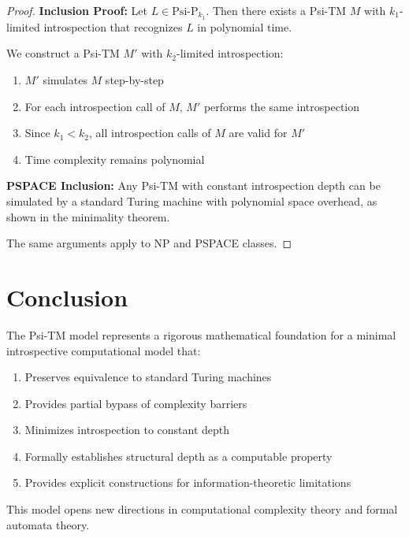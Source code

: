 \documentclass[11pt]{article}
\begin{document}
\begin{proof}
\textbf{Inclusion Proof:}
Let $L \in \text{Psi-P}_{k_1}$. Then there exists a Psi-TM $M$ with $k_1$-limited introspection that recognizes $L$ in polynomial time.

We construct a Psi-TM $M'$ with $k_2$-limited introspection:
\begin{enumerate}
\item $M'$ simulates $M$ step-by-step
\item For each introspection call of $M$, $M'$ performs the same introspection
\item Since $k_1 < k_2$, all introspection calls of $M$ are valid for $M'$
\item Time complexity remains polynomial
\end{enumerate}

\textbf{PSPACE Inclusion:}
Any Psi-TM with constant introspection depth can be simulated by a standard Turing machine with polynomial space overhead, as shown in the minimality theorem.

The same arguments apply to NP and PSPACE classes.
\end{proof}

\section{Conclusion}

The Psi-TM model represents a rigorous mathematical foundation for a minimal introspective computational model that:

\begin{enumerate}
\item Preserves equivalence to standard Turing machines
\item Provides partial bypass of complexity barriers
\item Minimizes introspection to constant depth
\item Formally establishes structural depth as a computable property
\item Provides explicit constructions for information-theoretic limitations
\end{enumerate}

This model opens new directions in computational complexity theory and formal automata theory.
\end{document}
